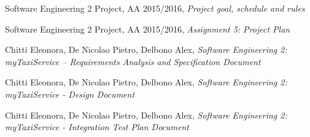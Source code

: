 \begin{thebibliography}{10}
        Software Engineering 2 Project, AA 2015/2016, \emph{Project goal, schedule and rules}

        Software Engineering 2 Project, AA 2015/2016, \emph{Assignment 5: Project Plan}

        Chitti Eleonora, De Nicolao Pietro, Delbono Alex,
        \emph{Software Engineering 2: myTaxiService –
        Requirements Analysis and Specification Document}

        Chitti Eleonora, De Nicolao Pietro, Delbono Alex, \emph{Software Engineering 2: myTaxiService - Design Document}

        Chitti Eleonora, De Nicolao Pietro, Delbono Alex, \emph{Software Engineering 2: myTaxiService - Integration Test Plan Document}

\end{thebibliography}
